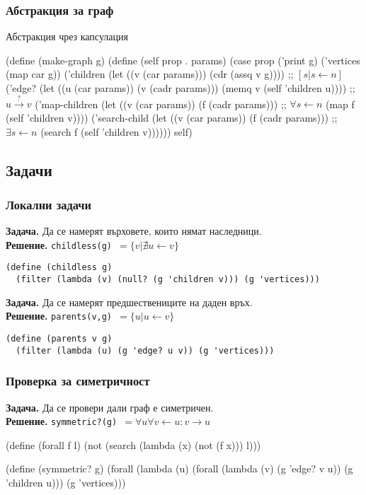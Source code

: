 \documentclass{beamer}
\begin{document}
\begin{frame}[fragile]
  \frametitle{Абстракция за граф}
  Абстракция чрез капсулация
  \small
\begin{semiverbatim}
(define (make-graph g)
  (define (self prop . params)
    (case prop
      ('print g)
      ('vertices (map car g))
      ('children (let ((v (car params)))
                   (cdr (assq v g))))             ;; \alert{\([s|s\leftarrow{}n]\)}
      ('edge? (let ((u (car params)) (v (cadr params)))
                (memq v (self 'children u))))     ;; \alert{\(u\stackrel?\rightarrow{}v\)}
      ('map-children (let ((v (car params))
                           (f (cadr params)))     ;; \alert{\(\forall{}s\leftarrow{}n\)}
                       (map f (self 'children v))))
      ('search-child (let ((v (car params))
                           (f (cadr params)))     ;; \alert{\(\exists{}s\leftarrow{}n\)}
                       (search f (self 'children v))))))
  self)
\end{semiverbatim}
\end{frame}

\subsection{Задачи}

\begin{frame}[fragile]
  \frametitle{Локални задачи}
  \small
  \textbf{Задача. }Да се намерят върховете, които нямат наследници.\\
  \pause
  \textbf{Решение. }\tt{childless(g)} $ = \{v | \nexists u \leftarrow v \}$
  \pause
\begin{verbatim}
(define (childless g)
  (filter (lambda (v) (null? (g 'children v))) (g 'vertices)))
\end{verbatim}
  \pause
  \vspace{1em}
  \textbf{Задача. }Да се намерят предшествениците на даден връх.\\
  \pause
  \textbf{Решение. }\tt{parents(v,g)} $ = \{u | u \leftarrow v \}$
  \pause
\begin{verbatim}
(define (parents v g)
  (filter (lambda (u) (g 'edge? u v)) (g 'vertices)))
\end{verbatim}
\end{frame}

\begin{frame}[fragile]
  \frametitle{Проверка за симетричност}
  \textbf{Задача. }Да се провери дали граф е симетричен.\\
  \pause
  \textbf{Решение. }\tt{symmetric?(g)} $ = \forall u\forall v\leftarrow u: v\rightarrow u$
  \pause
\begin{semiverbatim}
(define (forall f l)
  (not (search (lambda (x) (not (f x))) l)))\pause

(define (symmetric? g)
  (forall (lambda (u)
            (forall (lambda (v) (g 'edge? v u))
                    (g 'children u)))
            (g 'vertices)))
\end{semiverbatim}
\end{frame}
\end{document}
